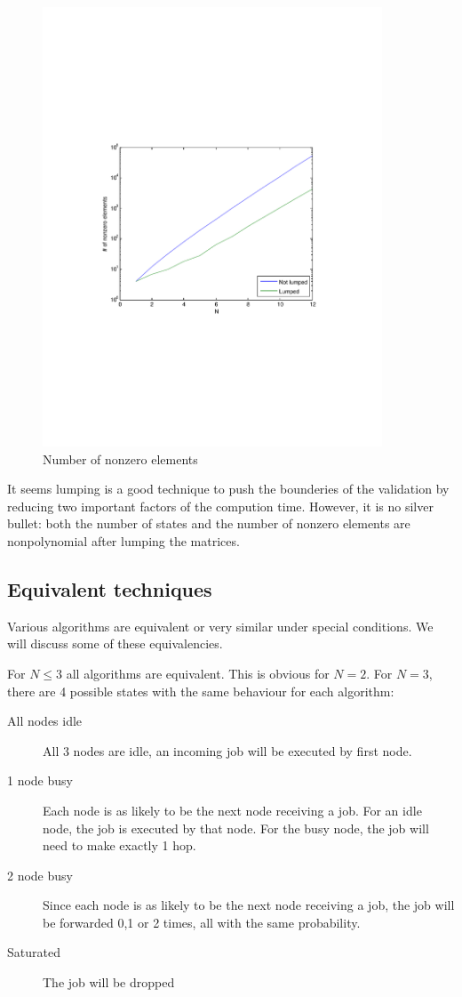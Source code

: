 \documentclass[10pt,a4paper]{article}
\begin{document}
\begin{figure}[h!tb]
\centering
\includegraphics[clip=true, trim=9em 24em 9em 24em, width=0.9\textwidth]{resources/plotlumpingnnz.pdf}
\caption{Number of nonzero elements}
\label{lumpnnz}
\end{figure}

It seems lumping is a good technique to push the bounderies of the validation by reducing two important factors of the compution time. However, it is no silver bullet: both the number of states and the number of nonzero elements are nonpolynomial after lumping the matrices.

\subsection{Equivalent techniques}
Various algorithms are equivalent or very similar under special conditions. We will discuss some of these equivalencies.

For $N \leq 3$ all algorithms are equivalent. This is obvious for $N=2$. For $N=3$, there are 4 possible states with the same behaviour for each algorithm:
\begin{description}
\item[All nodes idle] All 3 nodes are idle, an incoming job will be executed by first node.
\item[1 node busy] Each node is as likely to be the next node receiving a job. For an idle node, the job is executed by that node. For the busy node, the job will need to make exactly 1 hop.
\item[2 node busy] Since each node is as likely to be the next node receiving a job, the job will be forwarded 0,1 or 2 times, all with the same probability.
\item[Saturated] The job will be dropped
\end{description}
\end{document}
